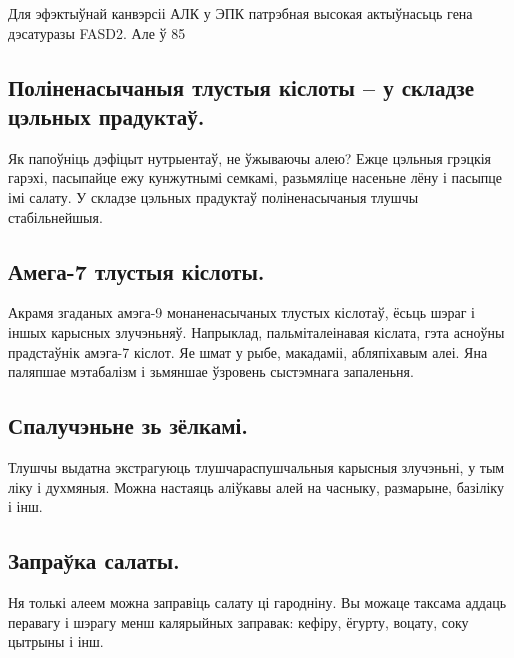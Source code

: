 Для эфэктыўнай канвэрсіі АЛК у ЭПК патрэбная высокая актыўнасьць гена дэсатуразы FASD2. Але ў 85%

\subsection{Поліненасычаныя тлустыя кіслоты – у складзе цэльных прадуктаў.}
Як папоўніць дэфіцыт нутрыентаў, не ўжываючы алею? Ежце цэльныя грэцкія гарэхі, пасыпайце ежу кунжутнымі семкамі, разьмяліце насеньне лёну і пасыпце імі салату. У складзе цэльных прадуктаў поліненасычаныя тлушчы стабільнейшыя.

\subsection{Амега-7 тлустыя кіслоты.}
Акрамя згаданых амэга-9 монаненасычаных тлустых кіслотаў, ёсьць шэраг і іншых карысных злучэньняў. Напрыклад, пальміталеінавая кіслата, гэта асноўны прадстаўнік амэга-7 кіслот. Яе шмат у рыбе, макадаміі, абляпіхавым алеі. Яна паляпшае мэтабалізм і зьмяншае ўзровень сыстэмнага запаленьня.

\subsection{Спалучэньне зь зёлкамі.}
Тлушчы выдатна экстрагуюць тлушчараспушчальныя карысныя злучэньні, у тым ліку і духмяныя. Можна настаяць аліўкавы алей на часныку, размарыне, базіліку і інш.

\subsection{Запраўка салаты.}
Ня толькі алеем можна заправіць салату ці гародніну. Вы можаце таксама аддаць перавагу і шэрагу менш калярыйных заправак: кефіру, ёгурту, воцату, соку цытрыны і інш.

